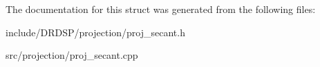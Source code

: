 The documentation for this struct was generated from the following files\-:\begin{DoxyCompactItemize}
\item 
include/\-D\-R\-D\-S\-P/projection/proj\-\_\-secant.\-h\item 
src/projection/proj\-\_\-secant.\-cpp\end{DoxyCompactItemize}
